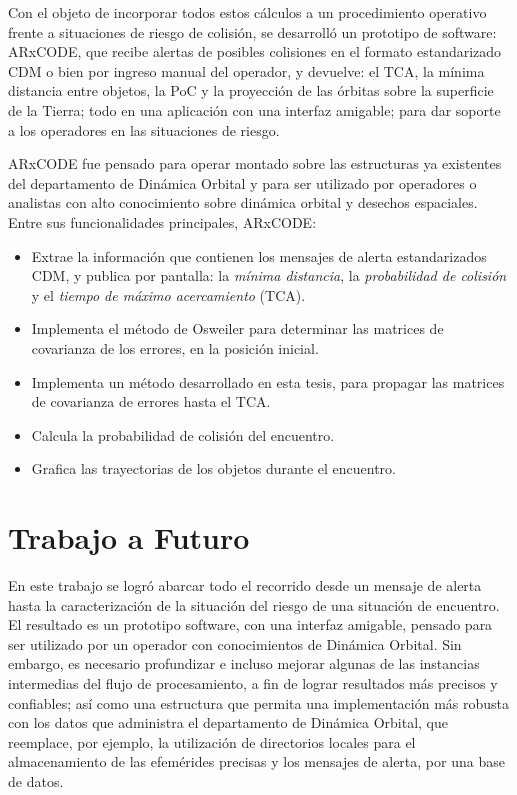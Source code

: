 Con el objeto de incorporar todos estos c\'alculos a un procedimiento operativo frente a situaciones de riesgo de colisi\'on, se desarroll\'o un prototipo de software: ARxCODE, que recibe alertas de posibles colisiones en el formato estandarizado CDM o bien por ingreso manual del operador, y devuelve: el TCA, la m\'inima distancia entre objetos, la PoC y la proyecci\'on de las \'orbitas sobre la superficie de la Tierra; todo en una aplicaci\'on con una interfaz amigable; para dar soporte a los operadores en las situaciones de riesgo. 

ARxCODE fue pensado para operar montado sobre las estructuras ya existentes del departamento de Din\'amica Orbital y para ser utilizado por operadores o analistas con alto conocimiento sobre din\'amica orbital y desechos espaciales.\\

Entre sus funcionalidades principales, ARxCODE:\\

\begin{itemize}
 \item Extrae la informaci\'on que contienen los mensajes de alerta estandarizados CDM, y publica por pantalla: la {\it{m\'inima distancia}}, la {\it{probabilidad de colisi\'on}} y el {\it{tiempo de m\'aximo acercamiento}} (TCA). 
 \item Implementa el m\'etodo de Osweiler \citep{osweiler} para determinar las matrices de covarianza de los errores, en la posici\'on inicial.
 \item Implementa un m\'etodo desarrollado en esta tesis, para propagar las matrices de covarianza de errores hasta el TCA.
 \item Calcula la probabilidad de colisi\'on del encuentro.
 \item Grafica las trayectorias de los objetos durante el encuentro.
\end{itemize}


\section*{Trabajo a Futuro}

En este trabajo se logr\'o abarcar todo el recorrido desde un mensaje de alerta hasta la caracterizaci\'on de la situaci\'on del riesgo de una situaci\'on de encuentro. El resultado es un prototipo software, con una interfaz amigable, pensado para ser utilizado por un operador con conocimientos de Din\'amica Orbital. Sin embargo, es necesario profundizar e incluso mejorar algunas de las instancias intermedias del flujo de procesamiento, a fin de lograr resultados m\'as precisos y confiables; as\'i como una estructura que permita una implementaci\'on m\'as robusta con los datos que administra el departamento de Din\'amica Orbital, que reemplace, por ejemplo, la utilizaci\'on de directorios locales para el almacenamiento de las efem\'erides precisas y los mensajes de alerta, por una base de datos.\\

